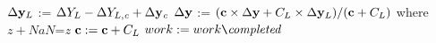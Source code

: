 \documentclass{article}
\begin{document}
\begin{algorithm}[H]
{{{            $\Delta {\bf y}_L$ := $\Delta {Y}_L- \Delta {Y}_{L,{\it c}} + \Delta {\bf y}_{\it c}$
            $\Delta {\bf y}$ := $({\bf c} \times \Delta {\bf y} + C_L \times \Delta {\bf y}_L)/({\bf c} + C_L)$ where $z+NaN$={\it z}
            ${\bf c} := {\bf c} + C_L$
        }
    }
    $work := work \texttt{\char`\\} {\it completed}$\\
}
\\
\label{alg:CatStratPD}
\end{algorithm}


{\small

}
\end{document}

